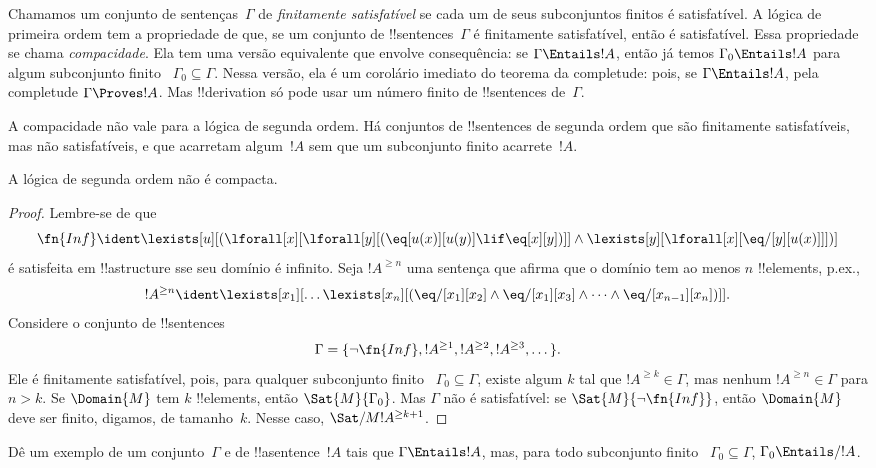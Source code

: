 \documentclass[../../../include/open-logic-section]{subfiles}
\begin{document}


\begin{explain}
Chamamos um conjunto de sentenças~$\Gamma$ de \emph{finitamente
satisfatível} se cada um de seus subconjuntos finitos é satisfatível. A
lógica de primeira ordem tem a propriedade de que, se um conjunto de
!!{sentence}s~$\Gamma$ é finitamente satisfatível, então é satisfatível.
Essa propriedade se chama \emph{compacidade}. Ela tem uma versão equivalente
que envolve consequência: se $\Gamma \Entails !A$, então já temos
$\Gamma_0 \Entails !A$ para algum subconjunto finito
~$\Gamma_0 \subseteq \Gamma$. Nessa versão, ela é um corolário imediato do
teorema da completude: pois, se $\Gamma \Entails !A$, pela completude
$\Gamma \Proves !A$. Mas !!{derivation} só pode usar um número finito de
!!{sentence}s de~$\Gamma$.

A compacidade não vale para a lógica de segunda ordem. Há conjuntos de
!!{sentence}s de segunda ordem que são finitamente satisfatíveis, mas não
satisfatíveis, e que acarretam algum~$!A$ sem que um subconjunto finito
acarrete~$!A$.
\end{explain}


\begin{thm}
A lógica de segunda ordem não é compacta.
\end{thm}

\begin{proof}
Lembre-se de que
\[
\fn{Inf} \ident \lexists[u][(\lforall[x][\lforall[y][(\eq[u(x)][u(y)]
      \lif \eq[x][y])]] \land \lexists[y][\lforall[x][\eq/[y][u(x)]]])]
\]
é satisfeita em !!a{structure} sse seu domínio é infinito. Seja
$!A^{\ge n}$ uma sentença que afirma que o domínio tem ao menos
$n$ !!{element}s, p.ex.,
\[
!A^{\ge n} \ident \lexists[x_1][\dots\lexists[x_n][(\eq/[x_1][x_2]
    \land \eq/[x_1][x_3] \land \dots \land \eq/[x_{n-1}][x_n])]].
\]
Considere o conjunto de !!{sentence}s
\[
\Gamma = \{\lnot \fn{Inf}, !A^{\ge 1}, !A^{\ge 2}, !A^{\ge 3}, \dots\}.
\]
Ele é finitamente satisfatível, pois, para qualquer subconjunto finito
~$\Gamma_0 \subseteq \Gamma$, existe algum $k$ tal que
$!A^{\ge k} \in \Gamma$, mas nenhum $!A^{\ge n} \in \Gamma$ para $n>k$.
Se $\Domain{M}$ tem $k$ !!{element}s, então $\Sat{M}{\Gamma_0}$. Mas
$\Gamma$ não é satisfatível: se $\Sat{M}{\lnot \fn{Inf}}$, então
$\Domain{M}$ deve ser finito, digamos, de tamanho~$k$. Nesse caso,
$\Sat/{M}{!A^{\ge k+1}}$.
\end{proof}

\begin{prob}
Dê um exemplo de um conjunto~$\Gamma$ e de !!a{sentence}~$!A$ tais que
$\Gamma \Entails !A$, mas, para todo subconjunto finito
~$\Gamma_0 \subseteq \Gamma$, $\Gamma_0 \Entails/ !A$.
\end{prob}
\end{document}
